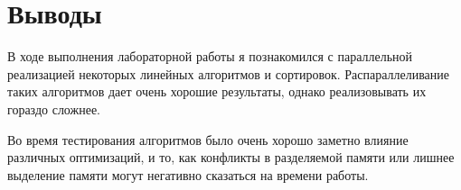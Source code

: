 \section{Выводы}
В ходе выполнения лабораторной работы я познакомился с параллельной реализацией некоторых линейных алгоритмов и сортировок. Распараллеливание таких алгоритмов дает очень хорошие результаты, однако реализовывать их гораздо сложнее.

Во время тестирования алгоритмов было очень хорошо заметно влияние различных оптимизаций, и то, как конфликты в разделяемой памяти или лишнее выделение памяти могут негативно сказаться на времени работы.
\pagebreak

